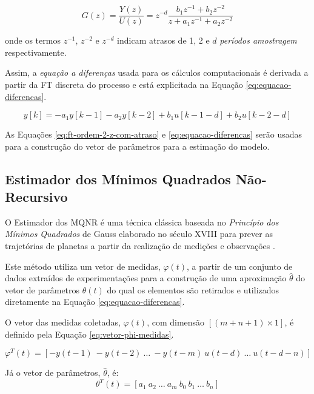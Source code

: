 			\begin{equation}
				\label{eq:ft-ordem-2-z-com-atraso}
				G(z) = \frac{Y(z)}{U(z)} = z^{-d} \frac{b_1 z^{-1} + b_2 z^{-2}}{z + a_1 z^{-1} + a_2 z^{-2}}
			\end{equation}
			
			\noindent
			onde os termos $z^{-1}$, $z^{-2}$ e $z^{-d}$ indicam atrasos de 1, 2 e $d$ \textit{períodos amostragem} respectivamente.

			Assim, a \textit{equação a diferenças} usada para os cálculos computacionais é derivada a partir da \gls{FT} discreta do processo e está explicitada na Equação \ref{eq:equacao-diferencas}.

			\begin{equation}
				\label{eq:equacao-diferencas}
				y[k] = -a_1 y[k-1] - a_2 y[k-2] + b_1 u[k-1-d] + b_2 u[k-2-d]
			\end{equation}

			As Equações \ref{eq:ft-ordem-2-z-com-atraso} e \ref{eq:equacao-diferencas} serão usadas para a construção do vetor de parâmetros para a estimação do modelo.

		\subsection{Estimador dos Mínimos Quadrados Não-Recursivo} \label{ssec:estimador-mqnr}

			O Estimador dos \gls{MQNR} é uma técnica clássica baseada no \textit{Princípio dos Mínimos Quadrados} de Gauss elaborado no século XVIII para prever as trajetórias de planetas a partir da realização de medições e observações \cite{coelho-identificacao}. 
			
			Este método utiliza um vetor de medidas, $\varphi(t)$, a partir de um conjunto de dados extraídos de experimentações para a construção de uma aproximação $\hat{\theta}$ do vetor de parâmetros $\theta(t)$ do qual os elementos são retirados e utilizados diretamente na Equação \ref{eq:equacao-diferencas}.

			O vetor das medidas coletadas, $\varphi(t)$, com dimensão $[(m + n + 1) \times 1]$, é definido pela Equação \ref{eq:vetor-phi-medidas}.

			\begin{equation}
				\label{eq:vetor-phi-medidas}
				\varphi^T(t) = [-y(t-1) \ -y(t-2) \ \ldots \ -y(t-m) \ u(t-d) \ \ldots \ u(t-d-n)]
			\end{equation}

			Já o vetor de parâmetros, $\hat{\theta}$, é:
			\begin{equation}
				\label{eq:vetor-theta-medidas}
				\theta^T(t) = [a_1 \ a_2 \ \ldots \ a_{m} \ b_0 \ b_1 \ \ldots \ b_{n}]
			\end{equation}

